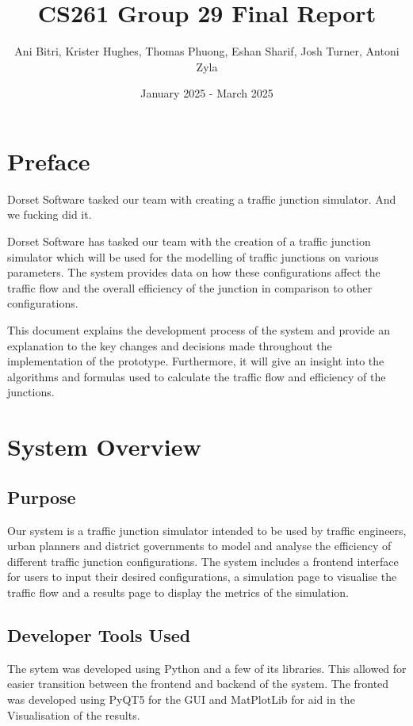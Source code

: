 \documentclass{article}
\title{\vspace{-1.5cm}CS261 Group 29 Final Report}
\author{Ani Bitri, Krister Hughes, Thomas Phuong, Eshan Sharif, Josh Turner, Antoni Zyla}
\date{January 2025 - March 2025}
\begin{document}
    \maketitle

    \tableofcontents

    \section{Preface}

    Dorset Software tasked our team with creating a traffic junction simulator. And we fucking did it.

    Dorset Software has tasked our team with the creation of a traffic junction simulator which will be used for the modelling of traffic junctions on various parameters. The system provides data on how these configurations
    affect the traffic flow and the overall efficiency of the junction in comparison to other configurations.

    This document explains the development process of the system and provide an explanation to the key changes and decisions made throughout the implementation of the prototype. Furthermore,
    it will give an insight into the algorithms and formulas used to calculate the traffic flow and efficiency of the junctions.


    \section{System Overview}

    \subsection{Purpose}

    Our system is a traffic junction simulator intended to be used by traffic engineers, urban planners and district governments to model and analyse the efficiency of different traffic junction configurations. The
    system includes a frontend interface for users to input their desired configurations, a simulation page to visualise the traffic flow and a results page to display the metrics of the simulation.

    \subsection{Developer Tools Used}

    The sytem was developed using Python and a few of its libraries. This allowed for easier transition between the frontend and backend of the system. The
    fronted was developed using PyQT5 for the GUI and MatPlotLib for aid in the Visualisation of the results.
\end{document}
